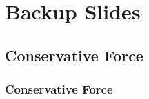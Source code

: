 % 

\section{Backup Slides}
\subsection{Conservative Force}

\begin{frame}\frametitle{Conservative Force}
\end{frame}


\endinput  %

